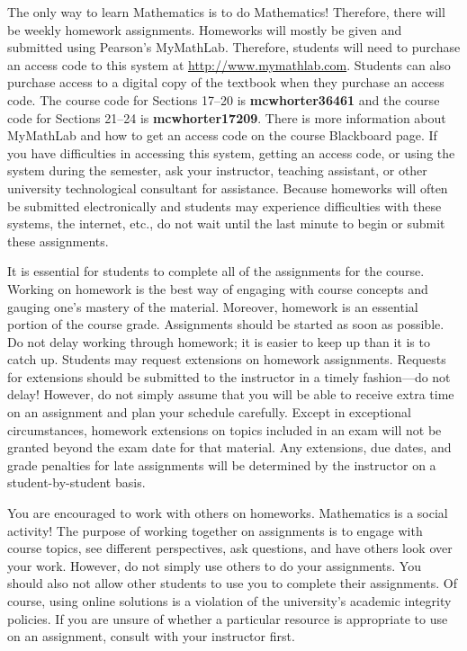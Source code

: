 \documentclass[11pt,letterpaper]{article}
\begin{document}
The only way to learn Mathematics is to do Mathematics! Therefore, there will be weekly homework assignments. Homeworks will mostly be given and submitted using Pearson's MyMathLab. Therefore, students will need to purchase an access code to this system at \url{http://www.mymathlab.com}. Students can also purchase access to a digital copy of the textbook when they purchase an access code. The course code for Sections 17--20 is \textbf{mcwhorter36461} and the course code for Sections 21--24 is \textbf{mcwhorter17209}. There is more information about MyMathLab and how to get an access code on the course Blackboard page. If you have difficulties in accessing this system, getting an access code, or using the system during the semester, ask your instructor, teaching assistant, or other university technological consultant for assistance. Because homeworks will often be submitted electronically and students may experience difficulties with these systems, the internet, etc., do not wait until the last minute to begin or submit these assignments. \pspace

It is essential for students to complete all of the assignments for the course. Working on homework is the best way of engaging with course concepts and gauging one's mastery of the material. Moreover, homework is an essential portion of the course grade. Assignments should be started as soon as possible. Do not delay working through homework; it is easier to keep up than it is to catch up. Students may request extensions on homework assignments. Requests for extensions should be submitted to the instructor in a timely fashion---do not delay! However, do not simply assume that you will be able to receive extra time on an assignment and plan your schedule carefully. Except in exceptional circumstances, homework extensions on topics included in an exam will not be granted beyond the exam date for that material. Any extensions, due dates, and grade penalties for late assignments will be determined by the instructor on a student-by-student basis. \pspace

You are encouraged to work with others on homeworks. Mathematics is a social activity! The purpose of working together on assignments is to engage with course topics, see different perspectives, ask questions, and have others look over your work. However, do not simply use others to do your assignments. You should also not allow other students to use you to complete their assignments. Of course, using online solutions is a violation of the university's academic integrity policies. If you are unsure of whether a particular resource is appropriate to use on an assignment, consult with your instructor first. \pspace
\end{document}
